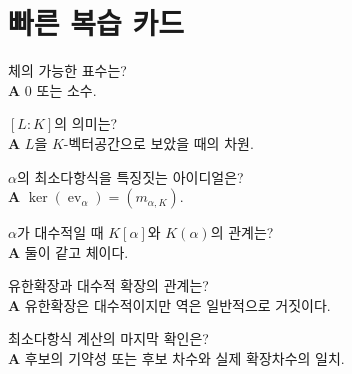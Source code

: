 \section{빠른 복습 카드}

\begin{description}[style=nextline]
  \item[Q] 체의 가능한 표수는?\\
  \textbf{A} $0$ 또는 소수.

  \item[Q] $[L:K]$의 의미는?\\
  \textbf{A} $L$을 $K$-벡터공간으로 보았을 때의 차원.

  \item[Q] $\alpha$의 최소다항식을 특징짓는 아이디얼은?\\
  \textbf{A} $\ker(\operatorname{ev}_\alpha)=(m_{\alpha,K})$.

  \item[Q] $\alpha$가 대수적일 때 $K[\alpha]$와 $K(\alpha)$의 관계는?\\
  \textbf{A} 둘이 같고 체이다.

  \item[Q] 유한확장과 대수적 확장의 관계는?\\
  \textbf{A} 유한확장은 대수적이지만 역은 일반적으로 거짓이다.

  \item[Q] 최소다항식 계산의 마지막 확인은?\\
  \textbf{A} 후보의 기약성 또는 후보 차수와 실제 확장차수의 일치.
\end{description}
